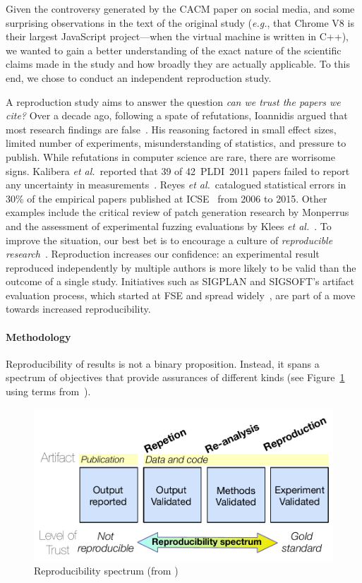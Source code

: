\documentclass[acmsmall]{acmart}
\newcommand{\cpp}{{\sf  C++}\xspace}
\newcommand{\js}{{\sf  JavaScript}\xspace}
\newcommand{\ea}{\emph{et al.}\xspace}
\begin{document}
Given the controversy generated by the CACM paper on social media, and some
surprising observations in the text of the original study (\emph{e.g.}, that
Chrome V8 is their largest \js project---when the virtual machine is written in
\cpp), we wanted to gain a better understanding of the exact nature of the
scientific claims made in the study and how broadly they are actually
applicable. To this end, we chose to conduct an independent reproduction
study.

A reproduction study aims to answer the question \emph{can we trust
  the papers we cite?} Over a decade ago, following a spate of refutations,
Ioannidis argued that most research findings are false~\cite{allfalse}. His
reasoning factored in small effect sizes, limited number of experiments,
misunderstanding of statistics, and pressure to publish.  While refutations
in computer science are rare, there are worrisome signs.
Kalibera \ea~reported that 39 of 42~PLDI~2011 papers
failed to report any uncertainty in measurements~\cite{emsoft11}.  Reyes \ea~catalogued
statistical errors in 30\% of the empirical papers published at
ICSE~\cite{se-errors} from 2006 to 2015. Other examples include the critical
review of patch generation research by Monperrus~\cite{Monperrus} and the
assessment of experimental fuzzing evaluations by Klees \ea~\cite{Klees}.
To improve the
situation, our best bet is to encourage a culture of \emph{reproducible
  research}~\cite{Feitelson}.  Reproduction increases our confidence: an
experimental result reproduced independently by multiple authors is more
likely to be valid than the outcome of a single study.  Initiatives such as
SIGPLAN and SIGSOFT's artifact evaluation process, which started at FSE and spread
widely~\cite{cacm15}, are part of a move towards increased reproducibility.

\paragraph{Methodology}
Reproducibility of results is not a binary proposition. Instead, it spans a
spectrum of objectives that provide assurances of different kinds (see
Figure~\ref{spec} using terms from~\cite{terms,emsoft11}).

\begin{figure}\begin{center}
\vspace{-2mm}
\includegraphics[width=.43\columnwidth]{Pictures/spectrum}\end{center}
\caption{Reproducibility spectrum (from \citep{spectrum})}\label{spec}
\vspace{-2mm}
\end{figure}
\end{document}
